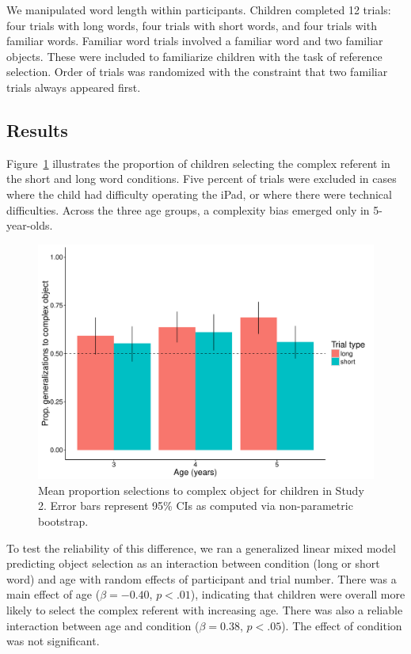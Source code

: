 We manipulated word length within participants. Children completed 12 trials: four trials with long words, four trials with short words, and four trials with familiar words. Familiar word trials involved a familiar word and two familiar objects. These were included to familiarize children with the task of reference selection. Order of trials was randomized with the constraint that two familiar trials always appeared first.

\subsection{Results}
Figure\ \ref{fig:study2} illustrates the proportion of children selecting the complex referent in the short and long word conditions. Five percent of trials were excluded in cases where the child had difficulty operating the iPad, or where there were technical difficulties.  Across the three age groups, a complexity bias emerged only in 5-year-olds.

\begin{figure}[t!]
\begin{center}
\includegraphics[scale = .5]{figs/chap4_2.pdf}
\end{center}
\caption{Mean proportion selections to complex object for children in Study 2. Error bars represent  95\% CIs as computed via non-parametric bootstrap. }
\label{fig:study2}
\end{figure}

To test the reliability of this difference, we ran a generalized linear mixed model predicting object selection as an interaction between condition (long or short word) and age with random effects of participant and trial number. There was a main effect of age ($\beta=-0.40$, $p <.01$), indicating that children were overall more likely to select the complex  referent with increasing age. There was also a reliable interaction between age and condition ($\beta=0.38$, $p <.05$). The effect of condition was not significant.


